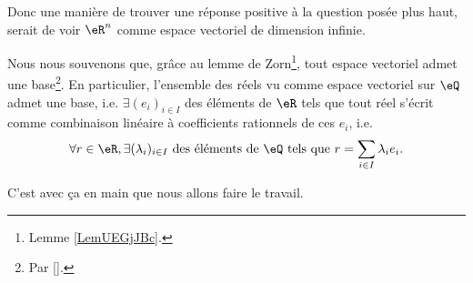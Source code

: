 Donc une manière de trouver une réponse positive à la question posée plus haut, serait de voir \( \eR^n\) comme espace vectoriel de dimension infinie. 

Nous nous souvenons que, grâce au lemme de Zorn\footnote{Lemme \ref{LemUEGjJBc}.}, tout espace vectoriel admet une base\footnote{Par \ref{}.}. En particulier, l'ensemble des réels vu comme espace vectoriel sur \( \eQ\) admet une base, i.e. \( \exists (e_i)_{i\in I}\)  des éléments de \( \eR\) tels que tout réel s'écrit comme combinaison linéaire à coefficients rationnels  de ces \( e_i\), i.e.
\begin{equation}
	\forall r \in \eR, \exists (\lambda_i)_{i\in I} \text{ des éléments de } \eQ \text{ tels que  } r = \sum_{i\in I} \lambda_i e_i.
\end{equation}

C'est avec ça en main que nous allons faire le travail.

